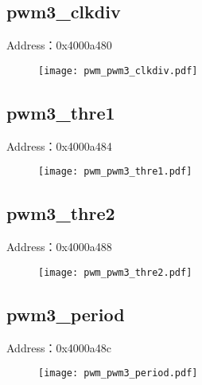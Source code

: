 \subsection{pwm3\_clkdiv}
\label{pwm-pwm3-clkdiv}
Address：0x4000a480
 \begin{figure}[H]
\texttt{[image: pwm\_pwm3\_clkdiv.pdf]}
\end{figure}

\subsection{pwm3\_thre1}
\label{pwm-pwm3-thre1}
Address：0x4000a484
 \begin{figure}[H]
\texttt{[image: pwm\_pwm3\_thre1.pdf]}
\end{figure}

\subsection{pwm3\_thre2}
\label{pwm-pwm3-thre2}
Address：0x4000a488
 \begin{figure}[H]
\texttt{[image: pwm\_pwm3\_thre2.pdf]}
\end{figure}

\subsection{pwm3\_period}
\label{pwm-pwm3-period}
Address：0x4000a48c
 \begin{figure}[H]
\texttt{[image: pwm\_pwm3\_period.pdf]}
\end{figure}

